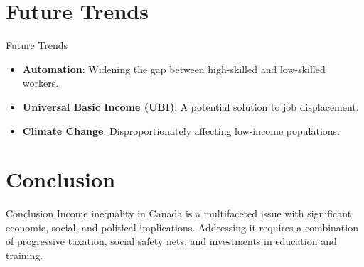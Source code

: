 \documentclass{beamer}
\begin{document}
\section{Future Trends}

\begin{frame}{Future Trends}
\begin{itemize}
    \item \textbf{Automation}: Widening the gap between high-skilled and low-skilled workers.
    \item \textbf{Universal Basic Income (UBI)}: A potential solution to job displacement.
    \item \textbf{Climate Change}: Disproportionately affecting low-income populations.
\end{itemize}
\end{frame}

\section{Conclusion}

\begin{frame}{Conclusion}
Income inequality in Canada is a multifaceted issue with significant economic, social, and political implications. Addressing it requires a combination of progressive taxation, social safety nets, and investments in education and training.
\end{frame}
\end{document}
